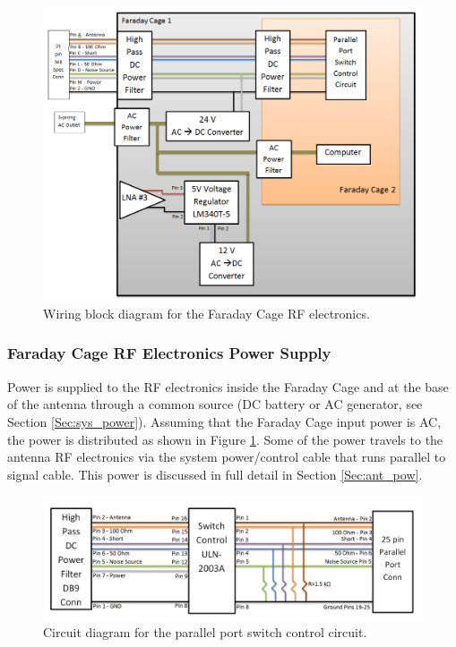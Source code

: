 \begin{figure}[htb]
\begin{center}
\includegraphics[width=0.9\linewidth]{SCIHI_system/figures/fcage_rf_power_block_diagram.png}
\caption{Wiring block diagram for the Faraday Cage RF electronics.}
\label{Fig:fcage_RF_pow_block_diagram}
\end{center}
\end{figure}

\subsubsection{Faraday Cage RF Electronics Power Supply}

Power is supplied to the RF electronics inside the Faraday Cage and at the base of the antenna through a common source (DC battery or AC generator, see Section \ref{Sec:sys_power}). Assuming that the Faraday Cage input power is AC, the power is distributed as shown in Figure \ref{Fig:fcage_RF_pow_block_diagram}. Some of the power travels to the antenna RF electronics via the system power/control cable that runs parallel to signal cable. This power is discussed in full detail in Section \ref{Sec:ant_pow}. 

\begin{figure}[htb]
\begin{center}
\includegraphics[width=0.9\linewidth]{SCIHI_system/figures/fcage_pp_con_circuit_diagram.png}
\caption{Circuit diagram for the parallel port switch control circuit.}
\label{Fig:fcage_ppcon_block_diagram}
\end{center}
\end{figure}

